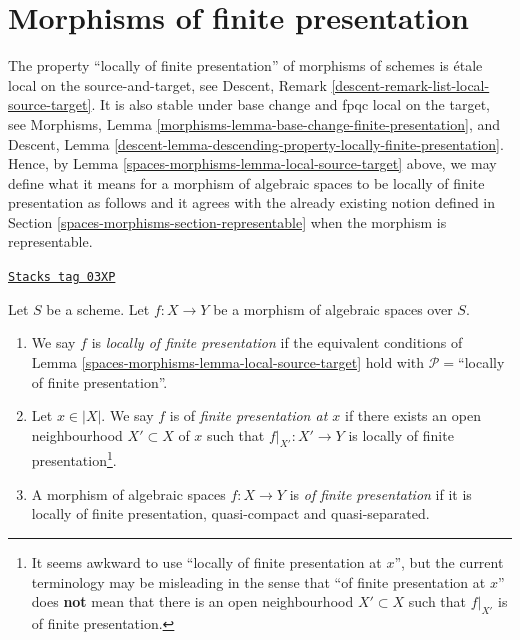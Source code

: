 \section{Morphisms of finite presentation}
\label{spaces-morphisms-section-finite-presentation}
The property ``locally of finite presentation'' of morphisms of schemes is
\'etale local on the source-and-target, see
Descent, Remark \ref{descent-remark-list-local-source-target}.
It is also stable under base change and fpqc local on the target, see
Morphisms, Lemma \ref{morphisms-lemma-base-change-finite-presentation}, and
Descent,
Lemma \ref{descent-lemma-descending-property-locally-finite-presentation}.
Hence, by
Lemma \ref{spaces-morphisms-lemma-local-source-target}
above, we may define what it means for a morphism of algebraic spaces
to be locally of finite presentation as
follows and it agrees with the already existing notion defined in
Section \ref{spaces-morphisms-section-representable}
when the morphism is representable.

\begin{definition}
\label{spaces-morphisms-definition-locally-finite-presentation}
\href{https://stacks.math.columbia.edu/tag/03XP}{\texttt{Stacks tag 03XP}}

Let $S$ be a scheme.
Let $f : X \to Y$ be a morphism of algebraic spaces over $S$.
\begin{enumerate}
\item We say $f$ is {\it locally of finite presentation} if
the equivalent conditions of
Lemma \ref{spaces-morphisms-lemma-local-source-target}
hold with $\mathcal{P} =$``locally of finite presentation''.
\item Let $x \in |X|$. We say $f$ is of {\it finite presentation at $x$}
if there exists an open neighbourhood $X' \subset X$ of $x$ such
that $f|_{X'} : X' \to Y$ is locally of finite
presentation\footnote{It seems awkward to use ``locally of finite presentation
at $x$'', but the current terminology may be misleading in the sense that
``of finite presentation at $x$'' does {\bf not} mean that there is
an open neighbourhood $X' \subset X$ such that $f|_{X'}$ is of finite
presentation.}.
\item A morphism of algebraic spaces $f : X \to Y$ is
{\it of finite presentation}
if it is locally of finite presentation, quasi-compact and
quasi-separated.
\end{enumerate}
\end{definition}

